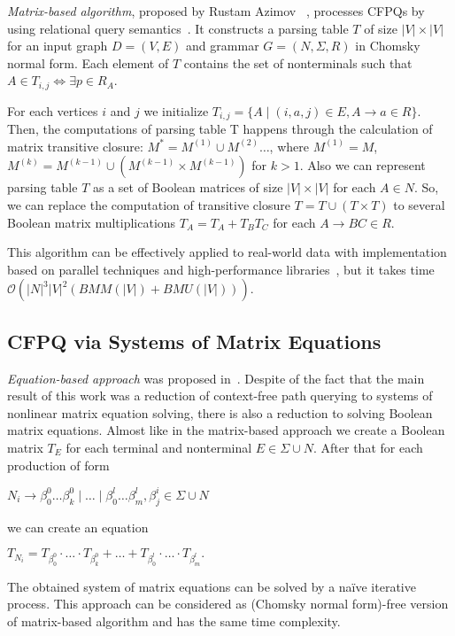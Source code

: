 \documentclass[sigconf, 10pt]{acmart}
\begin{document}
\emph{Matrix-based algorithm}, proposed by Rustam Azimov ~\cite{azimov2018context}, processes CFPQs by using relational query semantics~\cite{hellings2015querying}.
It constructs  a parsing table $T$ of size $|V| \times |V|$ for an input graph $D = (V, E)$ and grammar $G = (N,\Sigma,R)$ in Chomsky normal form.
Each element of $T$ contains the set of nonterminals such that $A \in T_{i,j} \iff \exists p \in R_A$.

For each vertices $i$ and $j$ we initialize $T_{i,j} = \{A \mid (i, a, j) \in E, A \rightarrow a \in R\}$. 
Then, the computations of parsing table T happens through the calculation of matrix transitive closure: $M^* = M^{(1)} \cup M^{(2)} \dots$, where $M^{(1)} = M$, $M^{(k)} = M^{(k-1)} \cup (M^{(k-1)} \times M^{(k-1)})$ for $k > 1$.
Also we can represent parsing table $T$ as a set of Boolean matrices of size $|V| \times |V|$ for each $A \in N$. So, we can replace the computation of transitive closure $T = T \cup (T \times T)$ to several Boolean matrix multiplications $T_A = T_A + T_B T_C$ for each $A \rightarrow BC \in R$.

This algorithm can be effectively applied to real-world data with implementation based on parallel techniques and high-performance libraries~\cite{mishin2019evaluation}, but it takes time \linebreak $\mathcal{O}(|N|^3|V|^2(BMM(|V|) + BMU(|V|)))$. 

\subsection{CFPQ via Systems of Matrix Equations}

\emph{Equation-based approach} was proposed in~\cite{susanina2020context}. Despite of the fact that the main result of this work was a reduction of context-free path querying to systems of nonlinear matrix equation solving, there is also a reduction to solving Boolean matrix equations. Almost like in the matrix-based approach we create a Boolean matrix $T_E$ for each terminal and nonterminal $E \in \Sigma \cup N$.
After that for each production of form 
\begin{center}
$N_i \to \beta^0_0 \dots \beta^0_k \mid \ldots \mid \beta^l_0 \dots \beta^l_m, \beta^i_j \in \Sigma \cup N$ 
\end{center}
we can create an equation 
\begin{center}
$T_{N_i} = T_{\beta^0_0}\cdot \ldots \cdot T_{\beta^0_k} + \ldots + T_{\beta^l_0}\cdot \ldots \cdot T_{\beta^l_m}.$
\end{center}
The obtained system of matrix equations can be solved by  a na\"ive iterative process.
This approach can be considered as (Chomsky normal form)-free version of matrix-based algorithm and has the same time complexity.
\end{document}
